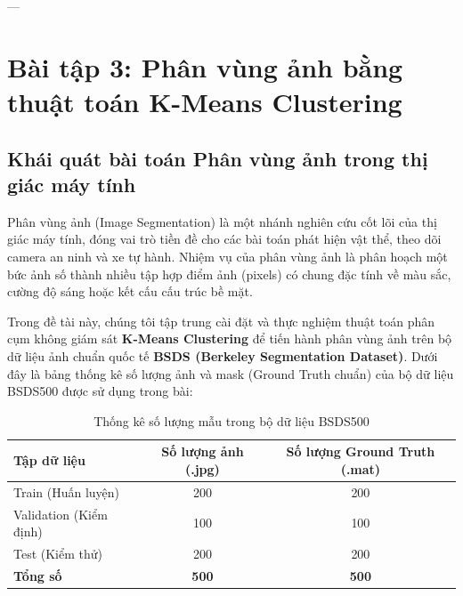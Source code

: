 \documentclass[a4paper]{article}
\begin{document}
---

\section{Bài tập 3: Phân vùng ảnh bằng thuật toán K-Means Clustering}

\subsection{Khái quát bài toán Phân vùng ảnh trong thị giác máy tính}
Phân vùng ảnh (Image Segmentation) là một nhánh nghiên cứu cốt lõi của thị giác máy tính, đóng vai trò tiền đề cho các bài toán phát hiện vật thể, theo dõi camera an ninh và xe tự hành. Nhiệm vụ của phân vùng ảnh là phân hoạch một bức ảnh số thành nhiều tập hợp điểm ảnh (pixels) có chung đặc tính về màu sắc, cường độ sáng hoặc kết cấu cấu trúc bề mặt.

Trong đề tài này, chúng tôi tập trung cài đặt và thực nghiệm thuật toán phân cụm không giám sát \textbf{K-Means Clustering} để tiến hành phân vùng ảnh trên bộ dữ liệu ảnh chuẩn quốc tế \textbf{BSDS (Berkeley Segmentation Dataset)}. Dưới đây là bảng thống kê số lượng ảnh và mask (Ground Truth chuẩn) của bộ dữ liệu BSDS500 được sử dụng trong bài:

\begin{table}[H]
\centering
\caption{Thống kê số lượng mẫu trong bộ dữ liệu BSDS500}
\label{tab:bsds500_distribution}
\begin{tabular}{lcc}
\toprule
\textbf{Tập dữ liệu} & \textbf{Số lượng ảnh (.jpg)} & \textbf{Số lượng Ground Truth (.mat)} \\ \midrule
Train (Huấn luyện) & 200 & 200 \\
Validation (Kiểm định) & 100 & 100 \\
Test (Kiểm thử) & 200 & 200 \\ \midrule
\textbf{Tổng số} & \textbf{500} & \textbf{500} \\ \bottomrule
\end{tabular}
\end{table}
\end{document}

